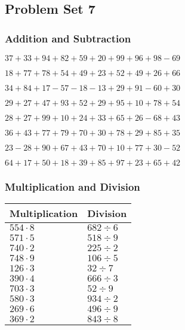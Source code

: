 \hypertarget{problem-set-7}{%
\subsection{Problem Set 7}\label{problem-set-7}}

\hypertarget{addition-and-subtraction}{%
\subsubsection{Addition and
Subtraction}\label{addition-and-subtraction}}

\(37+33+94+82+59+20+99+96+98-69\)

\(18+77+78+54+49+23+52+49+26+66\)

\(34+84+17-57-18-13+29+91-60+30\)

\(29+27+47+93+52+29+95+10+78+54\)

\(28+27+99+10+24+33+65+26-68+43\)

\(36+43+77+79+70+30+78+29+85+35\)

\(23-28+90+67+43+70+10+77+30-52\)

\(64+17+50+18+39+85+97+23+65+42\)

\hypertarget{multiplication-and-division}{%
\subsubsection{Multiplication and
Division}\label{multiplication-and-division}}

\begin{longtable}[]{@{}ll@{}}
\toprule
Multiplication & Division\tabularnewline
\midrule
\endhead
\(554\cdot8\) & \(682÷6\)\tabularnewline
\(571\cdot5\) & \(518÷9\)\tabularnewline
\(740\cdot2\) & \(225÷2\)\tabularnewline
\(748\cdot9\) & \(106÷5\)\tabularnewline
\(126\cdot3\) & \(32÷7\)\tabularnewline
\(390\cdot4\) & \(666÷3\)\tabularnewline
\(703\cdot3\) & \(52÷9\)\tabularnewline
\(580\cdot3\) & \(934÷2\)\tabularnewline
\(269\cdot6\) & \(496÷9\)\tabularnewline
\(369\cdot2\) & \(843÷8\)\tabularnewline
\bottomrule
\end{longtable}
